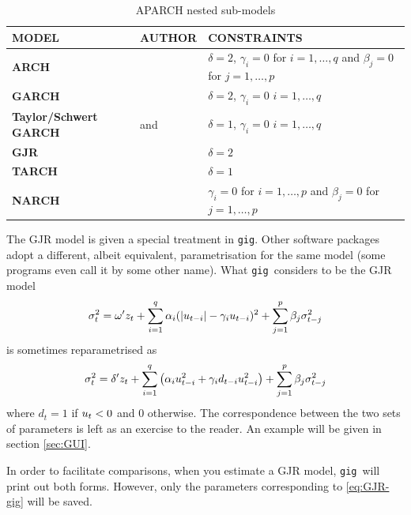 \documentclass[a4paper,11pt]{article}
\newcommand{\uhat}{\ensuremath u}
\newcommand{\gig}{\texttt{gig}}
\begin{document}
\begin{table}[hptb]
  \centering
  \begin{tabular}{p{}p{}p{}}
    \hline
    MODEL & AUTHOR & CONSTRAINTS \\
    \hline
    \textbf{ARCH} & \cite{Engle-82} & $\delta=2$, $\gamma_i = 0$ for
 $ i=1,\ldots,q$ and $\beta_j = 0$ for $j=1,\ldots,p$ \\
 \hline
 \textbf{GARCH} & \cite{Bollerslev-86} & $\delta=2$,
  $\gamma_i = 0$ $ i=1,\ldots,q$ \\
  \hline
  \textbf{Taylor/Schwert GARCH} & \cite{Taylor} and \cite{Schwert} & $\delta=1$,
  $\gamma_i = 0$ $ i=1,\ldots,q$\\
  \hline
  \textbf{GJR} & \cite{Glosten-Jagannathan-Runkle} & $\delta=2$ \\
  \hline
  \textbf{TARCH} & \cite{Zakoian} & $\delta=1$\\
  \hline
  \textbf{NARCH} & \cite{Higgins-Bera} & $\gamma_i = 0$ for
  $ i=1,\ldots,p$ and $\beta_j = 0$ for $j=1,\ldots,p$\\
  \hline  
  \end{tabular}
  \caption{APARCH nested sub-models}
  \label{tab:APARCH-submodels}
\end{table}

The GJR model is given a special treatment in \gig. Other software
packages adopt a different, albeit equivalent, parametrisation for the
same model (some programs even call it by some other name). What \gig\
considers to be the GJR model
\begin{equation} \label{eq:GJR-gig} \sigma_t^2 = \omega'z_t +
  \sum_{i=1}^q \alpha_i(|\uhat_{t-i}| - \gamma_i
  \uhat_{t-i})^2 + \sum_{j=1}^p\beta_j\sigma_{t-j}^2
\end{equation}
is sometimes reparametrised as
\begin{equation} \label{eq:GJR-eviews} \sigma_t^2 = \delta'z_t +
  \sum_{i=1}^q \left( \alpha_i \uhat_{t-i}^2 + \gamma_i d_{t-i}
  \uhat_{t-i}^2 \right) + \sum_{j=1}^p\beta_j\sigma_{t-j}^2
\end{equation}
where $d_t = 1$ if $\uhat_{t}<0$ and 0 otherwise. The correspondence
between the two sets of parameters is left as an exercise to the
reader. An example will be given in section \ref{sec:GUI}.

In order to facilitate comparisons, when you estimate a GJR model,
\gig\ will print out both forms. However, only the parameters
corresponding to \eqref{eq:GJR-gig} will be saved.
\end{document}
